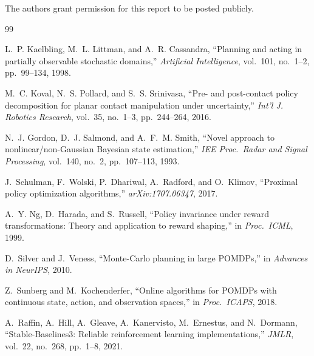 \documentclass[conference]{IEEEtran}
\begin{document}
The authors grant permission for this report to be posted publicly.

\begin{thebibliography}{99}

L.~P. Kaelbling, M.~L. Littman, and A.~R. Cassandra,
``Planning and acting in partially observable stochastic domains,''
\emph{Artificial Intelligence}, vol.~101, no.~1--2, pp.~99--134, 1998.

M.~C. Koval, N.~S. Pollard, and S.~S. Srinivasa,
``Pre- and post-contact policy decomposition for planar contact manipulation
under uncertainty,''
\emph{Int'l J. Robotics Research}, vol.~35, no.~1--3, pp.~244--264, 2016.

N.~J. Gordon, D.~J. Salmond, and A.~F.~M. Smith,
``Novel approach to nonlinear/non-Gaussian Bayesian state estimation,''
\emph{IEE Proc.\ Radar and Signal Processing}, vol.~140, no.~2,
pp.~107--113, 1993.

J.~Schulman, F.~Wolski, P.~Dhariwal, A.~Radford, and O.~Klimov,
``Proximal policy optimization algorithms,''
\emph{arXiv:1707.06347}, 2017.

A.~Y. Ng, D.~Harada, and S.~Russell,
``Policy invariance under reward transformations: Theory and application
to reward shaping,''
in \emph{Proc.\ ICML}, 1999.

D.~Silver and J.~Veness,
``Monte-Carlo planning in large POMDPs,''
in \emph{Advances in NeurIPS}, 2010.

Z.~Sunberg and M.~Kochenderfer,
``Online algorithms for POMDPs with continuous state, action, and
observation spaces,''
in \emph{Proc.\ ICAPS}, 2018.

A.~Raffin, A.~Hill, A.~Gleave, A.~Kanervisto, M.~Ernestus, and N.~Dormann,
``Stable-Baselines3: Reliable reinforcement learning implementations,''
\emph{JMLR}, vol.~22, no.~268, pp.~1--8, 2021.

\end{thebibliography}
\end{document}

